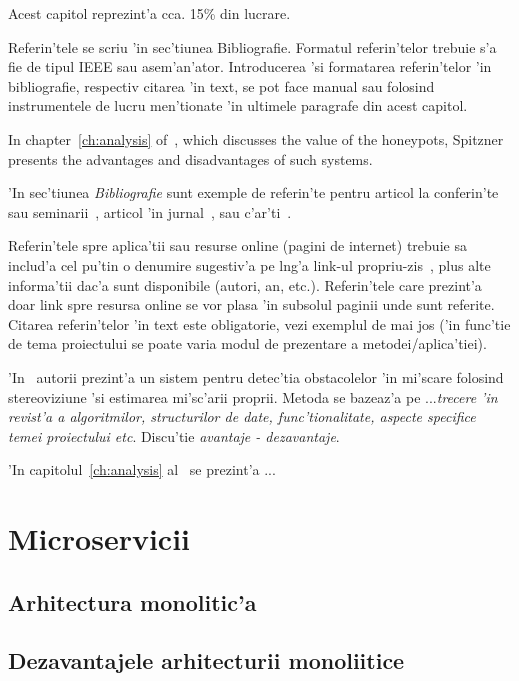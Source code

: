 \documentclass[12pt,a4paper,twoside]{report}
\begin{document}
Acest capitol reprezint'a cca. 15\% din lucrare.

Referin'tele se scriu 'in sec'tiunea Bibliografie. 
Formatul referin'telor trebuie s'a fie de tipul IEEE sau asem'an'ator. 
Introducerea 'si formatarea referin'telor 'in bibliografie, respectiv citarea 'in text, se pot face manual sau folosind instrumentele de lucru men'tionate 'in ultimele paragrafe din acest capitol.




In chapter~\ref{ch:analysis} of~\cite{strunk}, which discusses the value of the honeypots, Spitzner presents the advantages and disadvantages of such systems. 


'In sec'tiunea {\it Bibliografie} sunt exemple de referin'te pentru articol la conferin'te sau seminarii~\cite{BellucciLZ04}, articol 'in jurnal~\cite{AntoniouSBDB07}, 
sau c'ar'ti~\cite{russell1995artificial}. 


Referin'tele spre aplica'tii sau resurse online (pagini de internet) trebuie sa includ'a cel pu'tin o denumire sugestiv'a pe l\ia ng'a link-ul propriu-zis~\cite{webpage}, 
plus alte informa'tii dac'a sunt disponibile (autori, an, etc.). 
Referin'tele care prezint'a doar link spre resursa online se vor plasa 'in subsolul paginii unde sunt referite.
Citarea referin'telor 'in text este obligatorie, vezi exemplul de mai jos ('in func'tie de tema proiectului se poate varia modul de prezentare a metodei/aplica'tiei).

'In~\cite{AntoniouSBDB07} autorii prezint'a un sistem pentru detec'tia obstacolelor 'in mi'scare folosind stereoviziune 'si estimarea mi'sc'arii proprii. 
Metoda se bazeaz'a pe ...{\it trecere 'in revist'a a algoritmilor, structurilor de date, func'tionalitate, aspecte specifice temei proiectului etc}. Discu'tie {\it avantaje - dezavantaje}.


'In capitolul~\ref{ch:analysis} al~\cite{russell1995artificial} se prezint'a ...  

\section{Microservicii}
\subsection{Arhitectura monolitic'a} 

\subsection{Dezavantajele  arhitecturii monoliitice}
\end{document}
